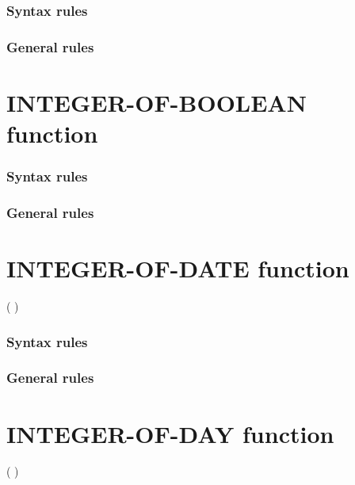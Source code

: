 \subsubsection{Syntax rules}

\subsubsection{General rules}

\section{INTEGER-OF-BOOLEAN function}

\begin{syntax}
\end{syntax}

\subsubsection{Syntax rules}

\subsubsection{General rules}

\section{INTEGER-OF-DATE function}

\begin{syntax}
    ( \argument )
\end{syntax}

\subsubsection{Syntax rules}

\subsubsection{General rules}

\section{INTEGER-OF-DAY function}

\begin{syntax}
    ( \argument )
\end{syntax}

